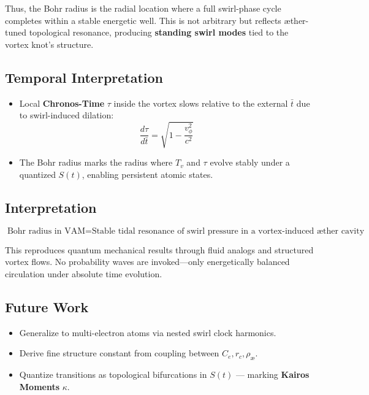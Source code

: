 Thus, the Bohr radius is the radial location where a full swirl-phase cycle completes within a stable energetic well. This is not arbitrary but reflects \ae ther-tuned topological resonance, producing \textbf{standing swirl modes} tied to the vortex knot's structure.

\subsection*{Temporal Interpretation}

\begin{itemize}
    \item Local \textbf{Chronos-Time} $\tau$ inside the vortex slows relative to the external $\bar{t}$ due to swirl-induced dilation:
    \[ \frac{d\tau}{d\bar{t}} = \sqrt{1 - \frac{v_\phi^2}{c^2}} \]
    \item The Bohr radius marks the radius where $T_v$ and $\tau$ evolve stably under a quantized $S(t)$, enabling persistent atomic states.
\end{itemize}

\subsection*{Interpretation}

\begin{equation}
    \boxed{
        \text{Bohr radius in VAM} =
        \text{Stable tidal resonance of swirl pressure in a vortex-induced \ae ther cavity}
    }
\end{equation}

This reproduces quantum mechanical results through fluid analogs and structured vortex flows. No probability waves are invoked---only energetically balanced circulation under absolute time evolution.

\subsection*{Future Work}

\begin{itemize}
    \item Generalize to multi-electron atoms via nested swirl clock harmonics.
    \item Derive fine structure constant from coupling between $C_e, r_c, \rho_\text{\ae}$.
    \item Quantize transitions as topological bifurcations in $S(t)$ --- marking \textbf{Kairos Moments} $\kappa$.
\end{itemize}